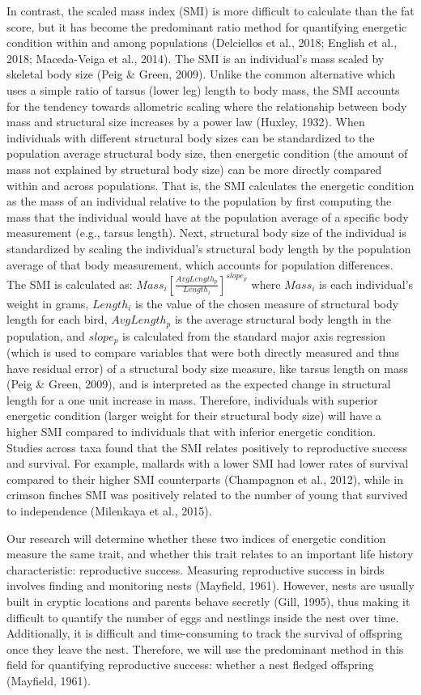 \documentclass[
]{article}
\begin{document}
In contrast, the scaled mass index (SMI) is more difficult to calculate
than the fat score, but it has become the predominant ratio method for
quantifying energetic condition within and among populations (Delciellos
et al., 2018; English et al., 2018; Maceda-Veiga et al., 2014). The SMI
is an individual's mass scaled by skeletal body size (Peig \& Green,
2009). Unlike the common alternative which uses a simple ratio of tarsus
(lower leg) length to body mass, the SMI accounts for the tendency
towards allometric scaling where the relationship between body mass and
structural size increases by a power law (Huxley, 1932). When
individuals with different structural body sizes can be standardized to
the population average structural body size, then energetic condition
(the amount of mass not explained by structural body size) can be more
directly compared within and across populations. That is, the SMI
calculates the energetic condition as the mass of an individual relative
to the population by first computing the mass that the individual would
have at the population average of a specific body measurement (e.g.,
tarsus length). Next, structural body size of the individual is
standardized by scaling the individual's structural body length by the
population average of that body measurement, which accounts for
population differences. The SMI is calculated as:
\(Mass_i\left[ \frac{AvgLength_p}{Length_i} \right]^{slope_p}\) where
\(Mass_i\) is each individual's weight in grams, \(Length_i\) is the
value of the chosen measure of structural body length for each bird,
\(AvgLength_p\) is the average structural body length in the population,
and \(slope_p\) is calculated from the standard major axis regression
(which is used to compare variables that were both directly measured and
thus have residual error) of a structural body size measure, like tarsus
length on mass (Peig \& Green, 2009), and is interpreted as the expected
change in structural length for a one unit increase in mass. Therefore,
individuals with superior energetic condition (larger weight for their
structural body size) will have a higher SMI compared to individuals
that with inferior energetic condition. Studies across taxa found that
the SMI relates positively to reproductive success and survival. For
example, mallards with a lower SMI had lower rates of survival compared
to their higher SMI counterparts (Champagnon et al., 2012), while in
crimson finches SMI was positively related to the number of young that
survived to independence (Milenkaya et al., 2015).

Our research will determine whether these two indices of energetic
condition measure the same trait, and whether this trait relates to an
important life history characteristic: reproductive success. Measuring
reproductive success in birds involves finding and monitoring nests
(Mayfield, 1961). However, nests are usually built in cryptic locations
and parents behave secretly (Gill, 1995), thus making it difficult to
quantify the number of eggs and nestlings inside the nest over time.
Additionally, it is difficult and time-consuming to track the survival
of offspring once they leave the nest. Therefore, we will use the
predominant method in this field for quantifying reproductive success:
whether a nest fledged offspring (Mayfield, 1961).
\end{document}
